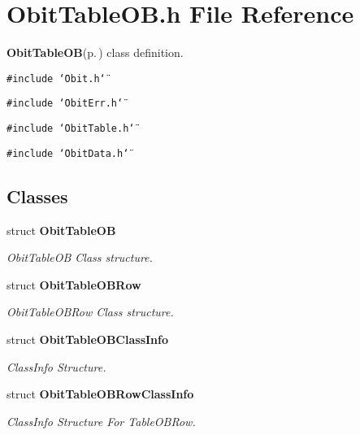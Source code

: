 \section{Obit\-Table\-OB.h File Reference}
\label{ObitTableOB_8h}
{\bf Obit\-Table\-OB}{\rm (p.\,\pageref{structObitTableOB})} class definition. 

{\tt \#include \char`\"{}Obit.h\char`\"{}}\par
{\tt \#include \char`\"{}Obit\-Err.h\char`\"{}}\par
{\tt \#include \char`\"{}Obit\-Table.h\char`\"{}}\par
{\tt \#include \char`\"{}Obit\-Data.h\char`\"{}}\par
\subsection*{Classes}
\begin{CompactItemize}
\item 
struct {\bf Obit\-Table\-OB}
\begin{CompactList}\small\item\em Obit\-Table\-OB Class structure. \item\end{CompactList}\item 
struct {\bf Obit\-Table\-OBRow}
\begin{CompactList}\small\item\em Obit\-Table\-OBRow Class structure. \item\end{CompactList}\item 
struct {\bf Obit\-Table\-OBClass\-Info}
\begin{CompactList}\small\item\em Class\-Info Structure. \item\end{CompactList}\item 
struct {\bf Obit\-Table\-OBRow\-Class\-Info}
\begin{CompactList}\small\item\em Class\-Info Structure For Table\-OBRow. \item\end{CompactList}\end{CompactItemize}
